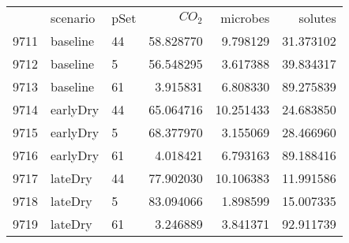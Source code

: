 \begin{tabular}{lllrrr}
 & scenario & pSet & $CO_2$ & microbes & solutes \\
9711 & baseline & 44 & 58.828770 & 9.798129 & 31.373102 \\
9712 & baseline & 5 & 56.548295 & 3.617388 & 39.834317 \\
9713 & baseline & 61 & 3.915831 & 6.808330 & 89.275839 \\
9714 & earlyDry & 44 & 65.064716 & 10.251433 & 24.683850 \\
9715 & earlyDry & 5 & 68.377970 & 3.155069 & 28.466960 \\
9716 & earlyDry & 61 & 4.018421 & 6.793163 & 89.188416 \\
9717 & lateDry & 44 & 77.902030 & 10.106383 & 11.991586 \\
9718 & lateDry & 5 & 83.094066 & 1.898599 & 15.007335 \\
9719 & lateDry & 61 & 3.246889 & 3.841371 & 92.911739 \\
\end{tabular}

